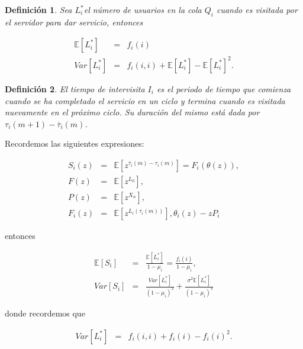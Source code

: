 \documentclass{article}
\newtheorem{Def}{Definición}
\newcommand{\esp}{\mathbb{E}}
\begin{document}
\begin{Def}
Sea $L_{i}^{*}$el n\'umero de usuarios en la cola $Q_{i}$ cuando es visitada por el servidor para dar servicio, entonces

\begin{eqnarray}
\esp\left[L_{i}^{*}\right]&=&f_{i}\left(i\right)\\
Var\left[L_{i}^{*}\right]&=&f_{i}\left(i,i\right)+\esp\left[L_{i}^{*}\right]-\esp\left[L_{i}^{*}\right]^{2}.
\end{eqnarray}

\end{Def}


\begin{Def}
El tiempo de intervisita $I_{i}$ es el periodo de tiempo que comienza cuando se ha completado el servicio en un ciclo y termina cuando es visitada nuevamente en el pr\'oximo ciclo. Su  duraci\'on del mismo est\'a dada por $\tau_{i}\left(m+1\right)-\overline{\tau}_{i}\left(m\right)$.
\end{Def}


Recordemos las siguientes expresiones:

\begin{eqnarray*}
S_{i}\left(z\right)&=&\esp\left[z^{\overline{\tau}_{i}\left(m\right)-\tau_{i}\left(m\right)}\right]=F_{i}\left(\theta\left(z\right)\right),\\
F\left(z\right)&=&\esp\left[z^{L_{0}}\right],\\
P\left(z\right)&=&\esp\left[z^{X_{n}}\right],\\
F_{i}\left(z\right)&=&\esp\left[z^{L_{i}\left(\tau_{i}\left(m\right)\right)}\right],
\theta_{i}\left(z\right)-zP_{i}
\end{eqnarray*}

entonces 

\begin{eqnarray*}
\esp\left[S_{i}\right]&=&\frac{\esp\left[L_{i}^{*}\right]}{1-\mu_{i}}=\frac{f_{i}\left(i\right)}{1-\mu_{i}},\\
Var\left[S_{i}\right]&=&\frac{Var\left[L_{i}^{*}\right]}{\left(1-\mu_{i}\right)^{2}}+\frac{\sigma^{2}\esp\left[L_{i}^{*}\right]}{\left(1-\mu_{i}\right)^{3}}
\end{eqnarray*}

donde recordemos que

\begin{eqnarray*}
Var\left[L_{i}^{*}\right]&=&f_{i}\left(i,i\right)+f_{i}\left(i\right)-f_{i}\left(i\right)^{2}.
\end{eqnarray*}
\end{document}
